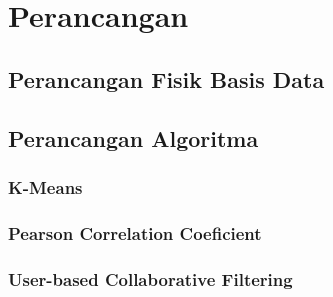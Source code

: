 \chapter{Perancangan}
\label{chap:perancangan}

\section{Perancangan Fisik Basis Data}

\section{Perancangan Algoritma}

\subsection{K-Means}

\subsection{Pearson Correlation Coeficient}

\subsection{User-based Collaborative Filtering}